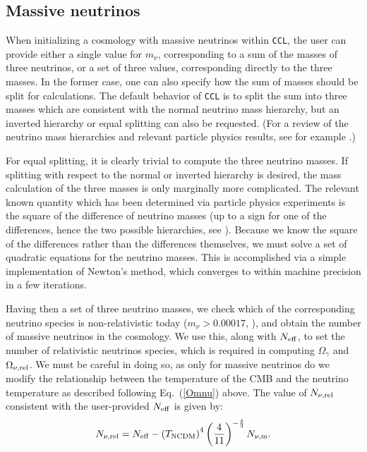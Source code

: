 \documentclass[\docopts]{\docclass}
\newcommand{\ccl}{{\tt CCL}\xspace}
\begin{document}
\subsection{Massive neutrinos}

When initializing a cosmology with massive neutrinos within \ccl , the user can provide either a single value for $m_\nu$, corresponding to a sum of the masses of three neutrinos, or a set of three values, corresponding directly to the three masses. In the former case, one can also specify how the sum of masses should be split for calculations. The default behavior of \ccl is to split the sum into three masses which are consistent with the normal neutrino mass hierarchy, but an inverted hierarchy or equal splitting can also be requested. (For a review of the neutrino mass hierarchies and relevant particle physics results, see for example \citealt{Gerbino2017, Lesgourgues2012}.)

For equal splitting, it is clearly trivial to compute the three neutrino masses. If splitting with respect to the normal or inverted hierarchy is desired, the mass calculation of the three masses is only marginally more complicated. The relevant known quantity which has been determined via particle physics experiments is the square of the difference of neutrino masses (up to a sign for one of the differences, hence the two possible hierarchies, see \citealt{Lesgourgues2012, Gerbino2017}). Because we know the square of the differences rather than the differences themselves, we must solve a set of quadratic equations for the neutrino masses. This is accomplished via a simple implementation of Newton's method, which converges to within machine precision in a few iterations.

Having then a set of three neutrino masses, we check which of the corresponding neutrino species is non-relativistic today ($m_\nu>0.00017$, \citealt{Lesgourgues2012}), and obtain the number of massive neutrinos in the cosmology. We use this, along with $N_{\rm eff}$, to set the number of relativistic neutrinos species, which is required in computing $\Omega_\gamma$ and $\Omega_{\nu, {\rm rel}}$. We must be careful in doing so, as only for massive neutrinos do we modify the relationship between the temperature of the CMB and the neutrino temperature as described following Eq.~(\ref{Omnu}) above. The value of $N_{\nu, {\rm rel}}$ consistent with the user-provided $N_{\rm eff}$ is given by:
\begin{equation}
N_{\nu, {\rm rel}} = N_{\rm eff} - \left(T_{\rm NCDM}\right)^{4} \left(\frac{4}{11}\right)^{-\frac{4}{3}} N_{\nu, {\rm m}}.
\label{Nnurel}
\end{equation}
\end{document}
